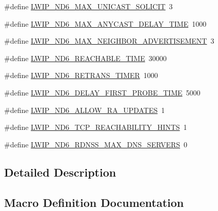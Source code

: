 \begin{DoxyCompactItemize}
\item 
\#define \hyperlink{group__lwip__opts__nd6_gafa6f4c2d2c259ab0895fa03a6f08c691}{L\+W\+I\+P\+\_\+\+N\+D6\+\_\+\+M\+A\+X\+\_\+\+U\+N\+I\+C\+A\+S\+T\+\_\+\+S\+O\+L\+I\+C\+IT}~3
\item 
\#define \hyperlink{group__lwip__opts__nd6_ga960b8973df083fad53ae0eaa79f8c4df}{L\+W\+I\+P\+\_\+\+N\+D6\+\_\+\+M\+A\+X\+\_\+\+A\+N\+Y\+C\+A\+S\+T\+\_\+\+D\+E\+L\+A\+Y\+\_\+\+T\+I\+ME}~1000
\item 
\#define \hyperlink{group__lwip__opts__nd6_ga86ab0cac87cdc7aeff09384ddbaaba2a}{L\+W\+I\+P\+\_\+\+N\+D6\+\_\+\+M\+A\+X\+\_\+\+N\+E\+I\+G\+H\+B\+O\+R\+\_\+\+A\+D\+V\+E\+R\+T\+I\+S\+E\+M\+E\+NT}~3
\item 
\#define \hyperlink{group__lwip__opts__nd6_ga269db9d61cdfc2fd3bc7b12c56261c74}{L\+W\+I\+P\+\_\+\+N\+D6\+\_\+\+R\+E\+A\+C\+H\+A\+B\+L\+E\+\_\+\+T\+I\+ME}~30000
\item 
\#define \hyperlink{group__lwip__opts__nd6_ga461abcbeef1d236d1f3201827dd28ad9}{L\+W\+I\+P\+\_\+\+N\+D6\+\_\+\+R\+E\+T\+R\+A\+N\+S\+\_\+\+T\+I\+M\+ER}~1000
\item 
\#define \hyperlink{group__lwip__opts__nd6_ga315bd6d4a9d185766dfc3253cd9d7715}{L\+W\+I\+P\+\_\+\+N\+D6\+\_\+\+D\+E\+L\+A\+Y\+\_\+\+F\+I\+R\+S\+T\+\_\+\+P\+R\+O\+B\+E\+\_\+\+T\+I\+ME}~5000
\item 
\#define \hyperlink{group__lwip__opts__nd6_gad35d10353ac7c7d2c8d4b83788cdc6d9}{L\+W\+I\+P\+\_\+\+N\+D6\+\_\+\+A\+L\+L\+O\+W\+\_\+\+R\+A\+\_\+\+U\+P\+D\+A\+T\+ES}~1
\item 
\#define \hyperlink{group__lwip__opts__nd6_ga9d7cb6fd447ef0f6726f565e2c7509c4}{L\+W\+I\+P\+\_\+\+N\+D6\+\_\+\+T\+C\+P\+\_\+\+R\+E\+A\+C\+H\+A\+B\+I\+L\+I\+T\+Y\+\_\+\+H\+I\+N\+TS}~1
\item 
\#define \hyperlink{group__lwip__opts__nd6_gaea4d829c0b52cc6cc28925eee89a7429}{L\+W\+I\+P\+\_\+\+N\+D6\+\_\+\+R\+D\+N\+S\+S\+\_\+\+M\+A\+X\+\_\+\+D\+N\+S\+\_\+\+S\+E\+R\+V\+E\+RS}~0
\end{DoxyCompactItemize}


\subsection{Detailed Description}


\subsection{Macro Definition Documentation}
\mbox{\label{group__lwip__opts__nd6_gad35d10353ac7c7d2c8d4b83788cdc6d9}} 
